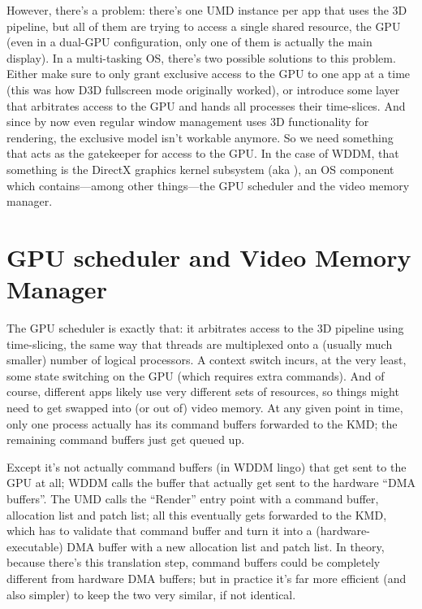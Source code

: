 However, there's a problem: there's one UMD instance per app that uses the 3D 
pipeline, but all of them are trying to access a single shared resource, the 
GPU (even in a dual-GPU configuration, only one of them is actually the main 
display).  In a multi-tasking OS, there's two possible solutions to this 
problem.  Either make sure to only grant exclusive access to the GPU to one app 
at a time (this was how D3D fullscreen mode originally worked), or introduce 
some layer that arbitrates access to the GPU and hands all processes their 
time-slices.  And since by now even regular window management uses 3D 
functionality for rendering, the exclusive model isn't workable anymore. So we 
need something that acts as the gatekeeper for access to the GPU. In the case 
of WDDM, that something is the DirectX graphics kernel subsystem (aka 
), an OS component which contains---among other things---the 
GPU scheduler and the video memory manager.

\section{GPU scheduler and Video Memory Manager}

The GPU scheduler is exactly that: it arbitrates access to the 3D pipeline 
using time-slicing, the same way that threads are multiplexed onto a (usually 
much smaller) number of logical processors. A context switch incurs, at the 
very least, some state switching on the GPU (which requires extra commands).  
And of course, different apps likely use very different sets of resources, so 
things might need to get swapped into (or out of) video memory. At any given 
point in time, only one process actually has its command buffers forwarded to 
the KMD; the remaining command buffers just get queued up.

Except it's not actually command buffers (in WDDM lingo) that get sent to the 
GPU at all; WDDM calls the buffer that actually get sent to the hardware ``DMA 
buffers''. The UMD calls the ``Render'' entry point with a command buffer, 
allocation list and patch list; all this eventually gets forwarded to the KMD, 
which has to validate that command buffer and turn it into 
a (hardware-executable) DMA buffer with a new allocation list and patch list.  
In theory, because there's this translation step, command buffers could be 
completely different from hardware DMA buffers; but in practice it's far more 
efficient (and also simpler) to keep the two very similar, if not identical.

